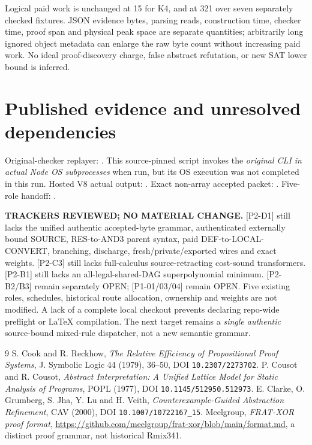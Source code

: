 \documentclass[11pt]{article}
\begin{document}
Logical paid work is unchanged at 15 for K4, and at 321 over seven separately checked fixtures. JSON evidence bytes, parsing reads, construction time, checker time, proof span and physical peak space are separate quantities; arbitrarily long ignored object metadata can enlarge the raw byte count without increasing paid work. No ideal proof-discovery charge, false abstract refutation, or new SAT lower bound is inferred.

\section*{Published evidence and unresolved dependencies}
\noindent Original-checker replayer:
. This source-pinned script invokes the \emph{original CLI in actual Node OS subprocesses} when run, but its OS execution was not completed in this run. Hosted V8 actual output:
.
Exact non-array accepted packet:
.
Five-role handoff:
.

\noindent\textbf{TRACKERS REVIEWED; NO MATERIAL CHANGE.} [P2-D1] still lacks the unified authentic accepted-byte grammar, authenticated externally bound SOURCE, RES-to-AND3 parent syntax, paid DEF-to-LOCAL-CONVERT, branching, discharge, fresh/private/exported wires and exact weights. [P2-C3] still lacks full-calculus source-retracting cost-sound transformers. [P2-B1] still lacks an all-legal-shared-DAG superpolynomial minimum. [P2-B2/B3] remain separately OPEN; [P1-01/03/04] remain OPEN. Five existing roles, schedules, historical route allocation, ownership and weights are not modified. A lack of a complete local checkout prevents declaring repo-wide preflight or LaTeX compilation. The next target remains a \emph{single authentic} source-bound mixed-rule dispatcher, not a new semantic grammar.

\begin{thebibliography}{9}
 S. Cook and R. Reckhow, \emph{The Relative Efficiency of Propositional Proof Systems}, J. Symbolic Logic 44 (1979), 36--50, DOI \texttt{10.2307/2273702}.
 P. Cousot and R. Cousot, \emph{Abstract Interpretation: A Unified Lattice Model for Static Analysis of Programs}, POPL (1977), DOI \texttt{10.1145/512950.512973}.
 E. Clarke, O. Grumberg, S. Jha, Y. Lu and H. Veith, \emph{Counterexample-Guided Abstraction Refinement}, CAV (2000), DOI \texttt{10.1007/10722167\_15}.
 Meelgroup, \emph{FRAT-XOR proof format}, \url{https://github.com/meelgroup/frat-xor/blob/main/format.md}, a distinct proof grammar, not historical Rmix341.
\end{thebibliography}
\end{document}
